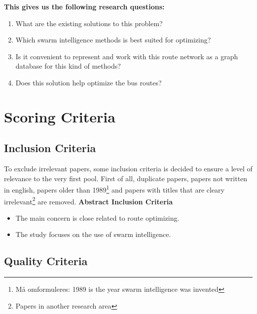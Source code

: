 \textbf{This gives us the following research questions:}
\begin{enumerate}
\item What are the existing solutions to this problem?
\item Which swarm intelligence methods is best suited for optimizing? 
\item Is it convenient to represent and work with this route network as a graph database for this kind of methods?
\item Does this solution help optimize the bus routes? 
\end{enumerate}

\section{Scoring Criteria}
\subsection{Inclusion Criteria}
To exclude irrelevant papers, some inclusion criteria is decided to ensure a level of relevance to the very first pool. First of all, duplicate papers, papers not written in english, papers older than 1989\footnote{ Må omformuleres: 1989 is the year swarm intelligence was invented} and papers with titles that are cleary irrelevant\footnote{ Papers in another research area} are removed. 
\newline
\newline
\textbf{Abstract Inclusion Criteria}
\begin{itemize}
\item The main concern is close related to route optimizing. 
\item The study focuses on the use of swarm intelligence.
\end{itemize}

\subsection{Quality Criteria}
